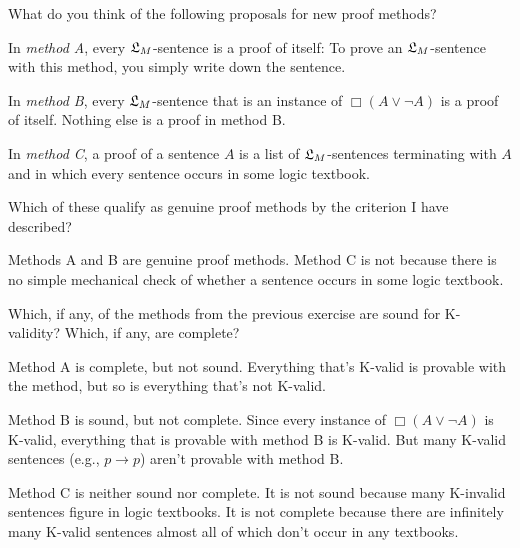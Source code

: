 \begin{exercise}\label{ex:proofmethods}
  What do you think of the following proposals for new proof methods?
  \begin{exlist}
    \item In \emph{method A}, every $\mathfrak{L}_{M}$-sentence is a proof of itself: To
    prove an $\mathfrak{L}_{M}$-sentence with this method, you simply write down the
    sentence.
    \item In \emph{method B}, every $\mathfrak{L}_{M}$-sentence that is an instance of
    $\Box(A \lor \neg A)$ is a proof of itself. Nothing else is a proof in
    method B.
    \item In \emph{method C}, a proof of a sentence $A$ is a list of
    $\mathfrak{L}_{M}$-sentences terminating with $A$ and in which every sentence occurs
    in some logic textbook.
  \end{exlist}
  \medskip%
  
  Which of these qualify as genuine proof methods by the criterion I have
  described?
\end{exercise}
\begin{solution}
  Methods A and B are genuine proof methods. Method C is not because there is no
  simple mechanical check of whether a sentence occurs in some logic textbook.
\end{solution}

\begin{exercise}\label{ex:sillyproofmethod}
  Which, if any, of the methods from the previous exercise are sound for
  K-validity? Which, if any, are complete?
\end{exercise}
\begin{solution}
  Method A is complete, but not sound. Everything that's K-valid is provable
  with the method, but so is everything that's not K-valid.
  
  Method B is sound, but not complete. Since every instance of
  $\Box (A \lor \neg A)$ is K-valid, everything that is provable with method B
  is K-valid. But many K-valid sentences (e.g., $p \to p$) aren't provable with
  method B.

  Method C is neither sound nor complete. It is not sound because many K-invalid
  sentences figure in logic textbooks. It is not complete because there
  are infinitely many K-valid sentences almost all of which don't occur in any
  textbooks.
\end{solution}


